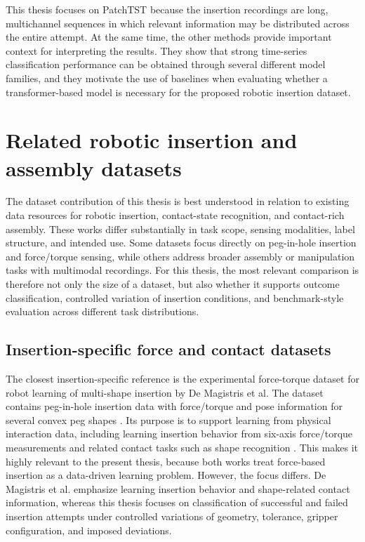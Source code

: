This thesis focuses on PatchTST because the insertion recordings are long, multichannel sequences in which relevant information may be distributed across the entire attempt. At the same time, the other methods provide important context for interpreting the results. They show that strong time-series classification performance can be obtained through several different model families, and they motivate the use of baselines when evaluating whether a transformer-based model is necessary for the proposed robotic insertion dataset.

\section{Related robotic insertion and assembly datasets}

The dataset contribution of this thesis is best understood in relation to existing data resources for robotic insertion, contact-state recognition, and contact-rich assembly. These works differ substantially in task scope, sensing modalities, label structure, and intended use. Some datasets focus directly on peg-in-hole insertion and force/torque sensing, while others address broader assembly or manipulation tasks with multimodal recordings. For this thesis, the most relevant comparison is therefore not only the size of a dataset, but also whether it supports outcome classification, controlled variation of insertion conditions, and benchmark-style evaluation across different task distributions.

\subsection{Insertion-specific force and contact datasets}

The closest insertion-specific reference is the experimental force-torque dataset for robot learning of multi-shape insertion by De Magistris et al. The dataset contains peg-in-hole insertion data with force/torque and pose information for several convex peg shapes \cite{magistrisExperimentalForceTorqueDataset2018}. Its purpose is to support learning from physical interaction data, including learning insertion behavior from six-axis force/torque measurements and related contact tasks such as shape recognition \cite{magistrisExperimentalForceTorqueDataset2018}. This makes it highly relevant to the present thesis, because both works treat force-based insertion as a data-driven learning problem. However, the focus differs. De Magistris et al. emphasize learning insertion behavior and shape-related contact information, whereas this thesis focuses on classification of successful and failed insertion attempts under controlled variations of geometry, tolerance, gripper configuration, and imposed deviations.

